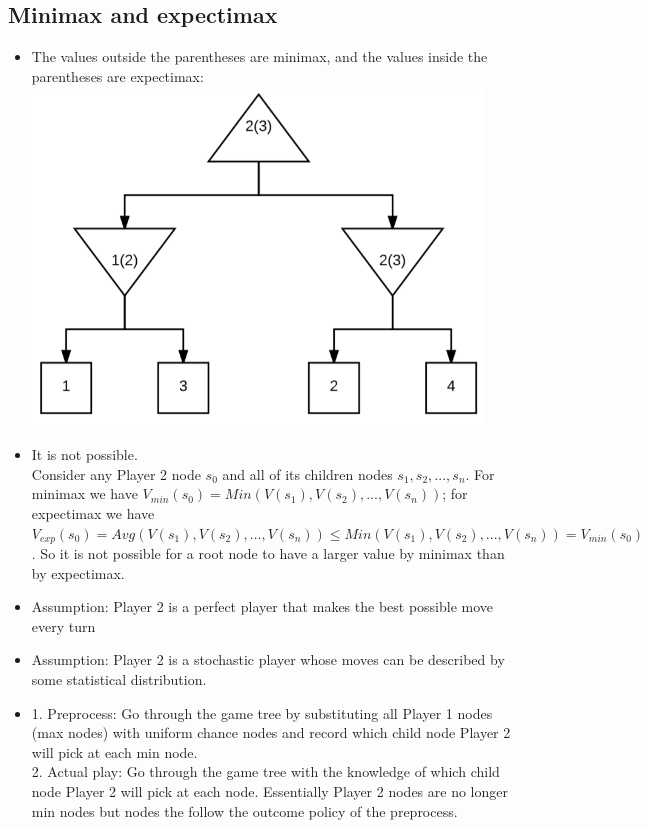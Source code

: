 \documentclass[11pt]{article}
\begin{document}
\begin{onehalfspace}
\section{Minimax and expectimax}
\begin{itemize}
\item The values outside the parentheses are minimax, and the values inside the parentheses are expectimax:\\
\includegraphics[width=12cm, height=9cm]{2_1.png}\\
\item
It is not possible.\\
Consider any Player 2 node $s_0$ and all of its children nodes $s_1,s_2,...,s_n$. For minimax we have $V_{min}(s_0) = Min(V(s_1), V(s_2), ..., V(s_n))$; for expectimax we have $V_{exp}(s_0) = Avg(V(s_1), V(s_2), ..., V(s_n)) \leq Min(V(s_1), V(s_2), ..., V(s_n)) = V_{min}(s_0)$. So it is not possible for a root node to have a larger value by minimax than by expectimax.\\
\item
Assumption: Player 2 is a perfect player that makes the best possible move every turn\\
\item
Assumption: Player 2 is a stochastic player whose moves can be described by some statistical distribution.\\
\item
1. Preprocess: Go through the game tree by substituting all Player 1 nodes (max nodes) with uniform chance nodes and record which child node Player 2 will pick at each min node.\\
2. Actual play: Go through the game tree with the knowledge of which child node Player 2 will pick at each node. Essentially Player 2 nodes are no longer min nodes but nodes the follow the outcome policy of the preprocess.\\
\end{itemize}

\end{onehalfspace}
\end{document}
